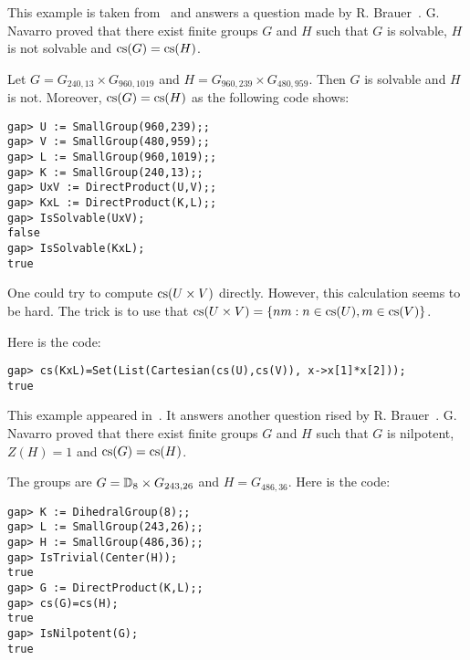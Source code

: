 \begin{example}
  \label{example:Navarro}
	This example is taken from~\cite[Theorem A]{MR3210919} and
	answers a question made by R. Brauer~\cite[Question 2(ii)]{MR2875589}.
  G. Navarro proved that there exist finite groups $G$ and $H$ such that $G$ is
  solvable, $H$ is not solvable and $\operatorname{cs}(G)=\operatorname{cs}(H)$.

  Let $G=G_{240,13}\times G_{960,1019}$ and
  $H=G_{960,239}\times G_{480,959}$.  Then $G$ is solvable and $H$ is not. Moreover, 
  $\operatorname{cs}(G)=\operatorname{cs}(H)$ as the following code shows:
\begin{lstlisting}
gap> U := SmallGroup(960,239);;
gap> V := SmallGroup(480,959);;
gap> L := SmallGroup(960,1019);;
gap> K := SmallGroup(240,13);;
gap> UxV := DirectProduct(U,V);;
gap> KxL := DirectProduct(K,L);;
gap> IsSolvable(UxV);
false
gap> IsSolvable(KxL);
true
\end{lstlisting}
One could try to compute $\operatorname{cs}(U\times V)$ directly. However, this calculation
seems to be hard. The trick is to use that
$\operatorname{cs}(U\times V)=\{nm:n\in\operatorname{cs}(U),m\in\operatorname{cs}(V)\}$.

Here is the code:
\begin{lstlisting}
gap> cs(KxL)=Set(List(Cartesian(cs(U),cs(V)), x->x[1]*x[2]));
true
\end{lstlisting}
\end{example}

\begin{example}
This example appeared in~\cite{MR3210919}. It answers another question rised by R. Brauer~\cite[Question 4(ii)]{MR2875589}.
  G. Navarro proved that there exist finite groups $G$ and $H$ such that $G$ is
  nilpotent, $Z(H)=1$ and $\operatorname{cs}(G)=\operatorname{cs}(H)$.

  The groups are $G=\mathbb{D}_8\times G_{243,26}$ and
  $H=G_{486,36}$. Here is the code:
\begin{lstlisting}
gap> K := DihedralGroup(8);;
gap> L := SmallGroup(243,26);;
gap> H := SmallGroup(486,36);;
gap> IsTrivial(Center(H));
true
gap> G := DirectProduct(K,L);;
gap> cs(G)=cs(H);
true
gap> IsNilpotent(G);
true
\end{lstlisting}
\end{example}



